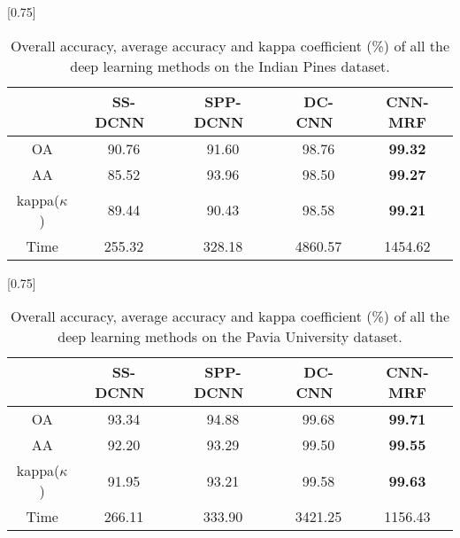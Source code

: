 \documentclass[journal]{IEEEtran}
\begin{document}
		\begin{table}[htp]
			\caption{\label{Indian-cnn-based-results} {{Overall accuracy, average accuracy and kappa coefficient (\%) of all the deep learning methods on the Indian Pines dataset.}}}
			\begin{center}
				{\normalsize
					\scalebox{0.75}[0.75]
					{
						\begin{tabular}{|c|c|c|c|c|}
							\hline
							& SS-DCNN~\cite{yue2015spectral}  & SPP-DCNN~\cite{yue2016deep}     & DC-CNN~\cite{zhang2017spectral}     & CNN-MRF \\
							\hline
							OA       & 90.76    & 91.60    & 98.76      &  \bf{99.32} \\
							\hline
							AA       & 85.52    & 93.96    & 98.50      &  \bf{99.27}\\
							\hline
							kappa($\kappa$)  & 89.44    & 90.43    & 98.58  &  \bf{99.21} \\
							\hline
							Time     & 255.32   & 328.18   & 4860.57    &  1454.62\\
							\hline
							
						\end{tabular}
					}
				}
			\end{center}
		\end{table}
		
		\begin{table}[htp]
			\caption{\label{paviaU-cnn-based-results} {{Overall accuracy, average accuracy and kappa coefficient (\%) of all the deep learning methods on the Pavia University dataset.}}}
			\begin{center}
				{\normalsize
					\scalebox{0.75}[0.75]
					{
						\begin{tabular}{|c|c|c|c|c|}
							\hline
							& SS-DCNN~\cite{yue2015spectral}  & SPP-DCNN~\cite{yue2016deep}    & DC-CNN~\cite{zhang2017spectral}   & CNN-MRF \\
							\hline
							OA       & 93.34    & 94.88    & 99.68      & \bf{99.71} \\
							\hline
							AA       & 92.20    & 93.29    & 99.50      & \bf{99.55} \\
							\hline
							kappa($\kappa$)  & 91.95    & 93.21    & 99.58  & \bf{99.63} \\
							\hline
							Time     & 266.11   & 333.90   & 3421.25    & 1156.43\\
							\hline
							
						\end{tabular}
					}
				}
			\end{center}
		\end{table}
		
\end{document}
